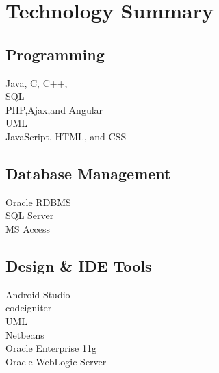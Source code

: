 \documentclass[letterpaper]{deedy-resume} %
\begin{document}
\begin{minipage}[t]{0.33\textwidth} %


\section{Technology Summary}

\subsection{Programming}
Java, C, C++,  \\
SQL \\
PHP,Ajax,and Angular\\
UML\\
JavaScript, HTML, and CSS \\

\sectionspace %
\subsection{Database Management}
Oracle RDBMS\\
 SQL Server\\
 MS Access\\
\sectionspace %
\subsection{Design & IDE Tools}
Android Studio   \\
codeigniter \\
UML \\
Netbeans\\
Oracle Enterprise 11g\\
Oracle WebLogic Server\\

\sectionspace %



\end{minipage}
\end{document}
